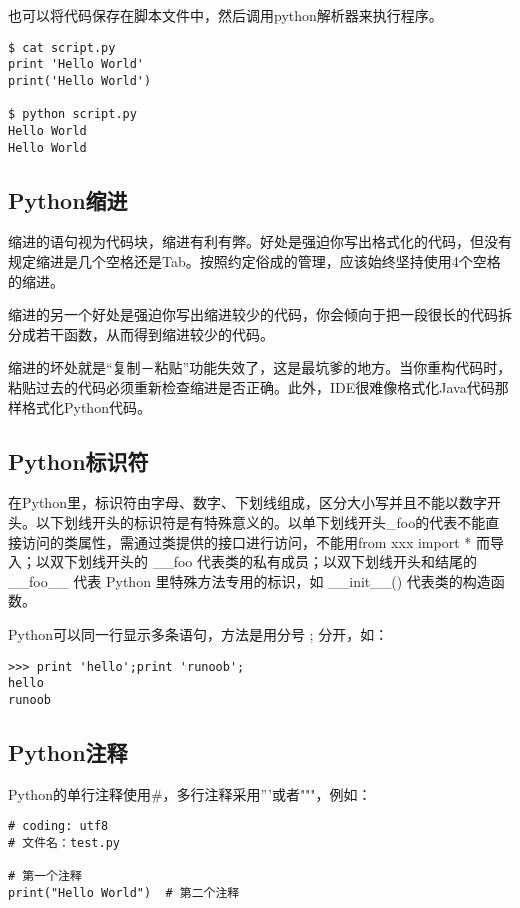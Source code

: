 \documentclass[10pt,a4paper]{ctexbook}
\begin{document}
也可以将代码保存在脚本文件中，然后调用python解析器来执行程序。
\begin{verbatim}
$ cat script.py
print 'Hello World'
print('Hello World')

$ python script.py
Hello World
Hello World
\end{verbatim}

\subsection{Python缩进}
缩进的语句视为代码块，缩进有利有弊。好处是强迫你写出格式化的代码，但没有规定缩进是几个空格还是Tab。按照约定俗成的管理，应该始终坚持使用4个空格的缩进。

缩进的另一个好处是强迫你写出缩进较少的代码，你会倾向于把一段很长的代码拆分成若干函数，从而得到缩进较少的代码。

缩进的坏处就是“复制－粘贴”功能失效了，这是最坑爹的地方。当你重构代码时，粘贴过去的代码必须重新检查缩进是否正确。此外，IDE很难像格式化Java代码那样格式化Python代码。


\subsection{Python标识符}
在Python里，标识符由字母、数字、下划线组成，区分大小写并且不能以数字开头。以下划线开头的标识符是有特殊意义的。以单下划线开头\_foo的代表不能直接访问的类属性，需通过类提供的接口进行访问，不能用from xxx import * 而导入；以双下划线开头的 \_\_foo 代表类的私有成员；以双下划线开头和结尾的 \_\_foo\_\_ 代表 Python 里特殊方法专用的标识，如 \_\_init\_\_() 代表类的构造函数。

Python可以同一行显示多条语句，方法是用分号 ; 分开，如：
\begin{verbatim}
>>> print 'hello';print 'runoob';
hello
runoob
\end{verbatim}

\subsection{Python注释}
Python的单行注释使用\#，多行注释采用'''或者"""，例如：
\begin{verbatim}
# coding: utf8
# 文件名：test.py

# 第一个注释
print("Hello World")  # 第二个注释
\end{verbatim}
\end{document}
